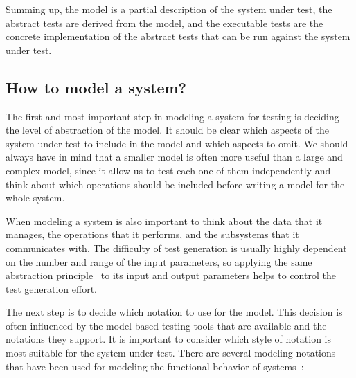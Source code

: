 Summing up, the model is a partial description of the system under test, the abstract tests are derived from the model, and the executable tests are the concrete implementation of the abstract tests that can be run against the system under test.

\subsection{How to model a system?}

The first and most important step in modeling a system for testing is deciding the level of abstraction of the model. It should be clear which aspects of the system under test to include in the model and which aspects to omit. We should always have in mind that a smaller model is often more useful than a large and complex model, since it allow us to test each one of them independently and think about which operations should be included before writing a model for the whole system. 

When modeling a system is also important to think about the data that it manages, the operations that it performs, and the subsystems that it communicates with. The difficulty of test generation is usually highly dependent on the number and range of the input parameters, so applying the same abstraction principle~\cite{Mosley2002} to its input and output parameters helps to control the test generation effort.

The next step is to decide which notation to use for the model. This decision is
often influenced by the model-based testing tools that are available and the
notations they support. It is important to consider which style of notation is
most suitable for the system under test. There are several modeling notations
that have been used for modeling the functional behavior of systems~\cite{1200168}: 


